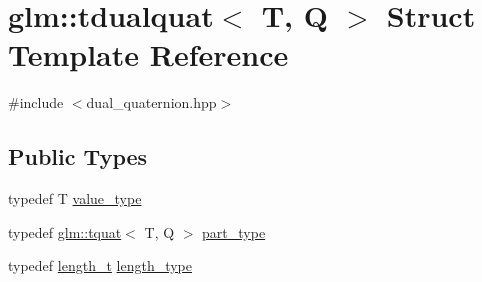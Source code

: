 \hypertarget{structglm_1_1tdualquat}{}\section{glm\+:\+:tdualquat$<$ T, Q $>$ Struct Template Reference}
\label{structglm_1_1tdualquat}


{\ttfamily \#include $<$dual\+\_\+quaternion.\+hpp$>$}

\subsection*{Public Types}
\begin{DoxyCompactItemize}
\item 
typedef T \hyperlink{structglm_1_1tdualquat_ab9028885c8de069ef8a61ebab77f7ccc}{value\+\_\+type}
\item 
typedef \hyperlink{structglm_1_1tquat}{glm\+::tquat}$<$ T, Q $>$ \hyperlink{structglm_1_1tdualquat_ab18b8665bbd568f9bc93ef93ed475a47}{part\+\_\+type}
\item 
typedef \hyperlink{namespaceglm_a090a0de2260835bee80e71a702492ed9}{length\+\_\+t} \hyperlink{structglm_1_1tdualquat_ad9fa4fd7f84d17bebd3efed6b5455d80}{length\+\_\+type}
\end{DoxyCompactItemize}
